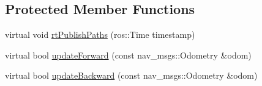 \subsection*{Protected Member Functions}
\begin{DoxyCompactItemize}
\item 
virtual void \hyperlink{classsmacc__odom__tracker_1_1OdomTracker_a8c9144a9d8b9ede7f45d06492496564c}{rt\+Publish\+Paths} (ros\+::\+Time timestamp)
\item 
virtual bool \hyperlink{classsmacc__odom__tracker_1_1OdomTracker_a7ef4ecc171a6fd37b2ed3c96a58e0659}{update\+Forward} (const nav\+\_\+msgs\+::\+Odometry \&odom)
\item 
virtual bool \hyperlink{classsmacc__odom__tracker_1_1OdomTracker_a3a47119be9af27de9115b043d1f76fe7}{update\+Backward} (const nav\+\_\+msgs\+::\+Odometry \&odom)
\end{DoxyCompactItemize}
